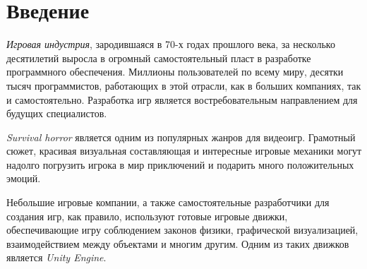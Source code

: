 
\section*{Введение}
\thispagestyle{withCompileDate}

\textit{Игровая индустрия}, зародившаяся в 70-х годах прошлого века, за несколько десятилетий выросла в огромный самостоятельный пласт в разработке программного обеспечения. Миллионы пользователей по всему миру, десятки тысяч программистов, работающих в этой отрасли, как в больших компаниях, так и самостоятельно. Разработка игр является востребовательным направлением для будущих специалистов.

\textit{Survival horror} является одним из популярных жанров для видеоигр. Грамотный сюжет, красивая визуальная составляющая и интересные игровые механики могут надолго погрузить игрока в мир приключений и подарить много положительных эмоций.

Небольшие игровые компании, а также самостоятельные разработчики для создания игр, как правило, используют готовые игровые движки, обеспечивающие игру соблюдением законов физики, графической визуализацией, взаимодействием между объектами и многим другим. Одним из таких движков является \textit{Unity Engine}.
